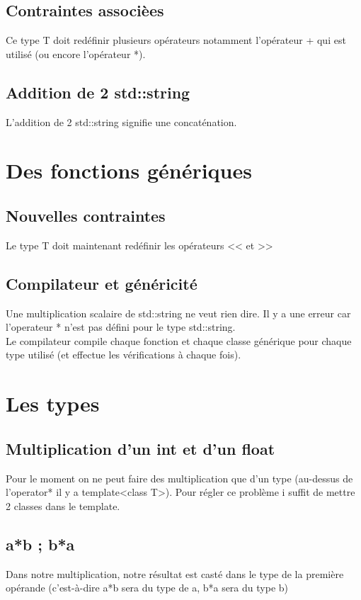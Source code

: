 \documentclass{article}
\begin{document}
\subsection{Contraintes associ\`ees}
Ce type T doit red\'efinir plusieurs op\'erateurs notamment l'op\'erateur + qui est utilis\'e (ou encore l'op\'erateur *).
\subsection{Addition de 2 std::string}
L'addition de 2 std::string signifie une concat\'enation.
\section{Des fonctions g\'en\'eriques}
\subsection{Nouvelles contraintes}
Le type T doit maintenant red\'efinir les op\'erateurs << et >>
\subsection{Compilateur et g\'en\'ericit\'e}
Une multiplication scalaire de std::string ne veut rien dire. Il y a une erreur car l'operateur * n'est pas d\'efini pour le type std::string.\\
Le compilateur compile chaque fonction et chaque classe g\'en\'erique pour chaque type utilis\'e (et effectue les v\'erifications \`a chaque fois).
\section{Les types}
\subsection{Multiplication d'un int et d'un float}
Pour le moment on ne peut faire des multiplication que d'un type (au-dessus de l'operator* il y a template<class T>). Pour r\'egler ce probl\`eme i suffit de mettre 2 classes dans le template.
\subsection{a*b ; b*a}
Dans notre multiplication, notre r\'esultat est cast\'e dans le type de la premi\`ere op\'erande (c'est-\`a-dire a*b sera du type de a, b*a sera du type b)
\end{document}
